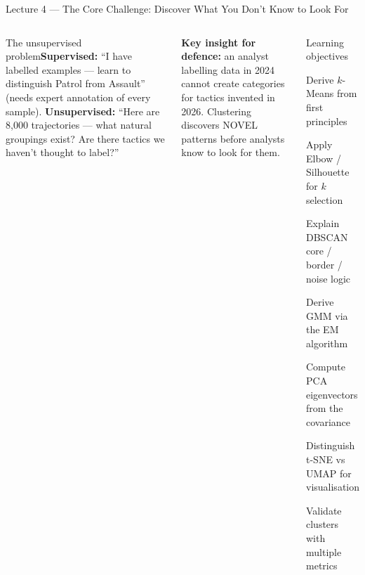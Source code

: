 \documentclass[aspectratio=169,10pt,t]{beamer}
\begin{document}

\begin{frame}{Lecture 4 --- The Core Challenge: Discover What You Don't Know to Look For}
\begin{columns}[T]
\begin{cbox}[ISSAnavy]{The unsupervised problem}\scriptsize \textbf{Supervised:} ``I have labelled examples --- learn to distinguish Patrol from Assault'' (needs expert annotation of every sample). \textbf{Unsupervised:} ``Here are 8,000 trajectories --- what natural groupings exist? Are there tactics we haven't thought to label?''\end{cbox}
\begin{rbox}\scriptsize\textbf{Key insight for defence:} an analyst labelling data in 2024 cannot create categories for tactics invented in 2026. Clustering discovers NOVEL patterns before analysts know to look for them.\end{rbox}
\begin{cbox}{Learning objectives}\scriptsize\begin{te}\item Derive $k$-Means from first principles\item Apply Elbow / Silhouette for $k$ selection\item Explain DBSCAN core / border / noise logic\item Derive GMM via the EM algorithm\item Compute PCA eigenvectors from the covariance\item Distinguish t-SNE vs UMAP for visualisation\item Validate clusters with multiple metrics\end{te}\end{cbox}

\end{columns}
\end{frame}
\end{document}
